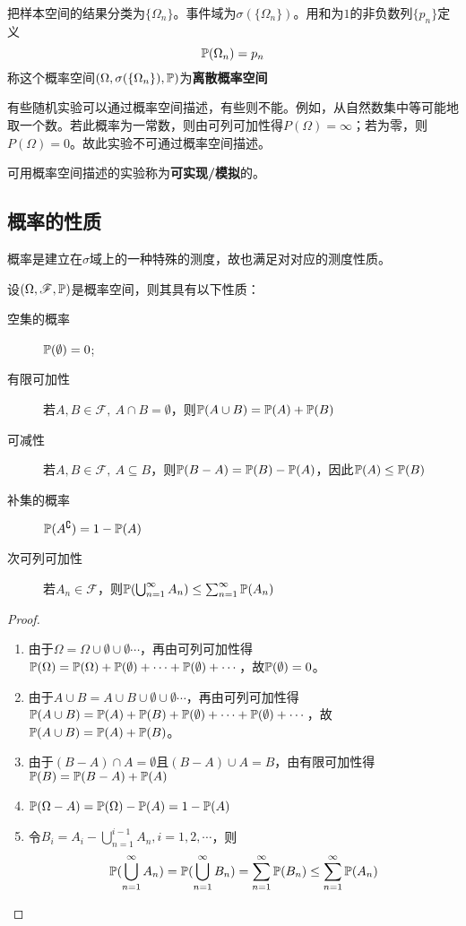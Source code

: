 \begin{example}[离散概率空间]
    把样本空间的结果分类为$\{ \Omega_n \}$。事件域为$\sigma(\{ \Omega_n \})$。用和为$1$的非负数列$\{ p_n \}$定义 
    \[ \P(\Omega_n)=p_n \]
    称这个概率空间$(\Omega, \sigma(\{ \Omega_n \}),\P)$为\textbf{离散概率空间}
\end{example}

有些随机实验可以通过概率空间描述，有些则不能。例如，从自然数集中等可能地取一个数。若此概率为一常数，则由可列可加性得$P(\Omega)=\infty$；若为零，则$P(\Omega)=0$。故此实验不可通过概率空间描述。

可用概率空间描述的实验称为\textbf{可实现/模拟}的。

\subsection{概率的性质}

概率是建立在$\sigma$域上的一种特殊的测度，故也满足对对应的测度性质。

\begin{proposition}[概率的加减性质]
    设$(\Omega,\mathscr{F},\P)$是概率空间，则其具有以下性质：
    \begin{description}
        \item[空集的概率]$\P(\emptyset)=0$;
        \item[有限可加性] 若$A,B \in \mathscr{F},\ A \cap B = \emptyset$，则$\P(A \cup B) = \P(A) + \P(B)$
        \item[可减性] 若$A,B \in \mathscr{F},\ A \subseteq B$，则$\P(B - A) = \P(B) - \P(A)$，因此$\P(A) \le \P(B)$
        \item[补集的概率]$\P(A^{\complement})=1-\P(A)$
        \item[次可列可加性] 若$A_n \in \mathscr{F}$，则$\P(\bigcup_{n=1}^{\infty}A_{n}) \le  \sum_{n=1}^{\infty}\P(A_{n})$
    \end{description}
\end{proposition}
\begin{proof}
    \begin{enumerate}
        \item 由于$\Omega=\Omega \cup \emptyset \cup \emptyset \cdots$，再由可列可加性得$\P(\Omega)=\P(\Omega)+\P(\emptyset)+\cdots + \P(\emptyset)+\cdots$，故$\P(\emptyset)=0$。
        \item 由于$A \cup B=A \cup B \cup \emptyset \cup \emptyset \cdots$，再由可列可加性得$\P(A \cup B)=\P(A)+\P(B)+ \P(\emptyset) +\cdots + \P(\emptyset)+\cdots$，故$\P(A \cup B) = \P(A) + \P(B)$。
        \item 由于$(B-A) \cap A=\emptyset$且$(B-A) \cup A=B$，由有限可加性得$\P(B)= \P(B - A) + \P(A)$
        \item$\P(\Omega-A)=\P(\Omega)-\P(A)=1-\P(A)$
        \item 令$B_i=A_i-\bigcup_{n=1}^{i-1}A_{n}, i=1,2,\cdots$，则
             $$\P(\bigcup_{n=1}^{\infty}A_{n})=\P(\bigcup_{n=1}^{\infty}B_{n}) = \sum_{n=1}^{\infty}\P(B_{n})\le  \sum_{n=1}^{\infty}\P(A_{n})$$
    \end{enumerate}
\end{proof}

